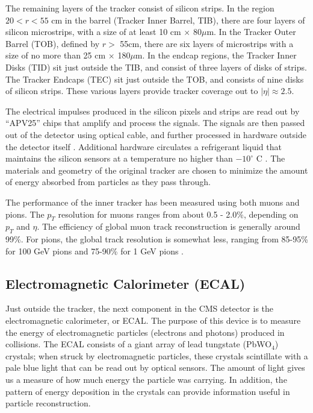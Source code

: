 The remaining layers of the tracker consist of silicon strips. In the
region $20 < r < 55$ cm in the barrel (Tracker Inner Barrel, TIB),
there are four layers of silicon
microstrips, with a size of at least 10 cm $\times$ 80$\mu$m. In the
Tracker Outer Barrel (TOB), defined by $r >$ 55cm, there are six
layers of microstrips with a size of no more than 25 cm $\times$
180$\mu$m. In the endcap regions, the Tracker Inner Disks (TID) sit
just outside the TIB, and consist of three layers of disks of
strips. The Tracker Endcaps (TEC) sit just outside the TOB, and
consists of nine disks of silicon strips. These various layers provide
tracker coverage out to $|\eta| \approx 2.5$.

The electrical impulses produced in the silicon pixels and strips are
read out by ``APV25'' chips that amplify and process the signals. The
signals are then passed out of the detector using optical cable, and
further processed in hardware outside the detector itself
\cite{tdr}. Additional hardware circulates a refrigerant liquid that
maintains the silicon sensors at a temperature no higher than
$-10^\circ$ C \cite{accelexper}. The materials and geometry of the
original tracker are chosen to minimize the amount of energy absorbed
from particles as they pass through.

The performance of the inner tracker has been measured using both
muons and pions. The $p_T$ resolution for muons ranges from about 0.5
- 2.0\%, depending on $p_T$ and $\eta$. The efficiency of
global muon track reconstruction is generally around 99\%. For pions,
the global track resolution is somewhat less, ranging from 85-95\% for
100 GeV pions and 75-90\% for 1 GeV pions \cite{tdr}.

\subsection{Electromagnetic Calorimeter (ECAL)}
\label{ssec:cms:components:ecal}

Just outside the tracker, the next component in the CMS
detector is the electromagnetic calorimeter, or ECAL. The purpose of
this device is to measure the energy of electromagnetic particles
(electrons and photons) produced in collisions. The ECAL consists
of a giant array of lead tungstate (PbWO$_4$) crystals; when struck by
electromagnetic particles, these crystals scintillate with a
pale blue light that can be read out by optical sensors. The amount of
light gives us a measure of how much energy the particle was
carrying. In addition, the pattern of energy deposition in the
crystals can provide information useful in particle
reconstruction.

